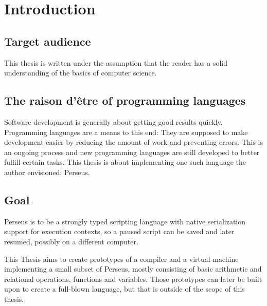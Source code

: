 
\chapter{Introduction}


    
    \section{Target audience}
    This thesis is written under the assumption that the reader has a solid understanding of the basics of computer science.
    
	\section{The raison d'être of programming languages}
	
	Software development is generally about getting good results quickly. Programming languages are a means to this end: They are supposed to make development easier by reducing the amount of work and preventing errors. This is an ongoing process and new programming languages are still developed to better fulfill certain tasks. This thesis is about implementing one such language the author envisioned: Perseus.

	\section{Goal} %
	
	Perseus is to be a strongly typed scripting language with native serialization support for execution contexts, so a paused script can be saved and later resumed, possibly on a different computer.
	
	This Thesis aims to create prototypes of a compiler and a virtual machine implementing a small subset of Perseus, mostly consisting of basic arithmetic and relational operations, functions and variables. Those prototypes can later be built upon to create a full-blown language, but that is outside of the scope of this thesis.
	
